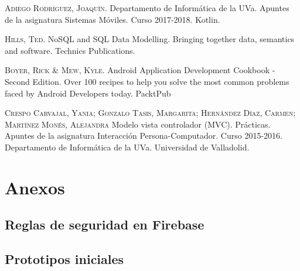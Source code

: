 \documentclass[twoside]{report}
\begin{document}
\begin{thebibliography}{a}
 \textsc{Adiego Rodríguez, Joaquín}. Departamento de Informática de la UVa. Apuntes de la asignatura Sistemas Móviles. Curso 2017-2018. Kotlin.

 \textsc{Hills, Ted}. NoSQL and SQL Data Modelling. Bringing together data, semantics and software. Technics Publications.

 \textsc{Boyer, Rick \& Mew, Kyle}. Android Application Development Cookbook - Second Edition. Over 100 recipes to help you solve the most common problems faced by Android Developers today. PacktPub

 \textsc{Crespo Carvajal, Yania; Gonzalo Tasis, Margarita; Hernández Díaz, Carmen; Martínez Monés, Alejandra} Modelo vista controlador (MVC). Prácticas. Apuntes de la asignatura Interacción Persona-Computador. Curso 2015-2016. Departamento de Informática de la UVa. Universidad de Valladolid. 

\end{thebibliography}

\chapter{Anexos}

\section{Reglas de seguridad en Firebase}

\section{Prototipos iniciales}
\end{document}
